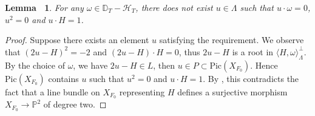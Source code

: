 \documentclass[12pt,reqno,a4paper]{amsart}
\newtheorem{lem}[thm]{Lemma~}
\theoremstyle{remark}
\theoremstyle{definition}
\newcommand{\PP}{\mathbb{P}}
\newcommand{\DD}{\mathbb{D}}
\newcommand{\calH}{\mathcal{H}}
\newcommand{\Pic}{\mathrm{Pic}}
\begin{document}
\begin{lem}
\label{lem: no calH'_T}
    For any $\omega\in \DD_T-\calH_T$, there does not exist $u\in \Lambda$ such that $u\cdot\omega=0$, $u^2=0$ and $u\cdot H=1$.
\end{lem}
\begin{proof}
Suppose there exists an element $u$ satisfying the requirement.
We observe that $(2u-H)^2=-2$ and $(2u-H)\cdot H=0$, thus $2u-H$ is a root in $\langle H,\omega \rangle^\perp_{\Lambda}$.
    By the choice of $\omega$, we have $2u-H\in L$, then $u\in P \subset \Pic(X_{F_0})$.
Hence $\Pic(X_{F_0})$ contains $u$ such that $u^2=0$ and $u\cdot H=1$.
    By \cite[Proposition 1.7]{urabe1988combinations}, this contradicts the fact that a line bundle on $X_{F_0}$ representing $H$ defines a surjective morphism $X_{F_0}\to \PP^2$ of degree two.
\end{proof}
\end{document}
